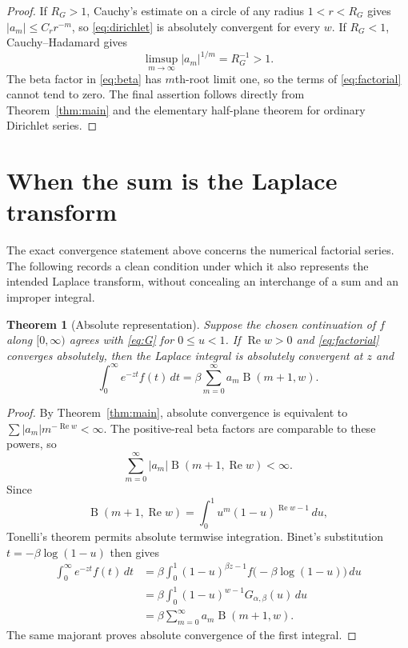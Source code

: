 \documentclass[11pt]{article}
\newtheorem{theorem}{Theorem}
\newcommand{\B}{\operatorname{B}}
\begin{document}
\begin{proof}
If $R_G>1$, Cauchy's estimate on a circle of any radius
$1<r<R_G$ gives $|a_m|\leq C_r r^{-m}$, so \eqref{eq:dirichlet} is absolutely
convergent for every $w$.  If $R_G<1$, Cauchy--Hadamard gives
\[
 \limsup_{m\to\infty}|a_m|^{1/m}=R_G^{-1}>1.
\]
The beta factor in \eqref{eq:beta} has $m$th-root limit one, so the terms of
\eqref{eq:factorial} cannot tend to zero.  The final assertion follows
directly from Theorem~\ref{thm:main} and the elementary half-plane theorem for
ordinary Dirichlet series.
\end{proof}

\section{When the sum is the Laplace transform}

The exact convergence statement above concerns the numerical factorial
series.  The following records a clean condition under which it also
represents the intended Laplace transform, without concealing an interchange
of a sum and an improper integral.

\begin{theorem}[Absolute representation]\label{thm:representation}
Suppose the chosen continuation of $f$ along $[0,\infty)$ agrees with
\eqref{eq:G} for $0\leq u<1$.  If $\operatorname{Re}w>0$ and
\eqref{eq:factorial} converges absolutely, then the Laplace integral is
absolutely convergent at $z$ and
\begin{equation}\label{eq:representation}
 \int_0^\infty e^{-zt}f(t)\,dt
 =\beta\sum_{m=0}^{\infty}a_m\B(m+1,w).
\end{equation}
\end{theorem}

\begin{proof}
By Theorem~\ref{thm:main}, absolute convergence is equivalent to
$\sum|a_m|m^{-\operatorname{Re}w}<\infty$.  The positive-real beta factors
are comparable to these powers, so
\[
 \sum_{m=0}^{\infty}|a_m|\B(m+1,\operatorname{Re}w)<\infty.
\]
Since
\[
 \B(m+1,\operatorname{Re}w)
 =\int_0^1 u^m(1-u)^{\operatorname{Re}w-1}\,du,
\]
Tonelli's theorem permits absolute termwise integration.  Binet's substitution
$t=-\beta\log(1-u)$ then gives
\begin{align*}
 \int_0^\infty e^{-zt}f(t)\,dt
 &=\beta\int_0^1(1-u)^{\beta z-1}
       f\bigl(-\beta\log(1-u)\bigr)\,du\\
 &=\beta\int_0^1(1-u)^{w-1}G_{\alpha,\beta}(u)\,du\\
 &=\beta\sum_{m=0}^{\infty}a_m\B(m+1,w).
\end{align*}
The same majorant proves absolute convergence of the first integral.
\end{proof}
\end{document}
